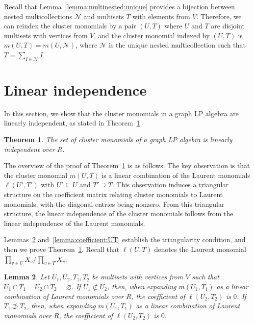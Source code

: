 \documentclass[11pt]{article}
\newtheorem{theo}{Theorem}[section]
\newtheorem{lemm}[theo]{Lemma}
\theoremstyle{definition}
\numberwithin{equation}{section}
\newcommand{\vertices}{V}
\newcommand{\coefficientring}{R}
\newcommand{\laurentmonomial}[2]{\ell(#1, #2)}
\newcommand{\monomial}[2]{m(#1, #2)}
\begin{document}
Recall that Lemma~\ref{lemma:multinested:unique} provides a bijection between nested multicollections \(\mathcal{N}\) and multisets \(T\) with elements from \(\vertices\).
Therefore, we can reindex the cluster monomials by a pair \((U, T)\) where \(U\) and \(T\) are disjoint multisets with vertices from \(\vertices\),
and the cluster monomial indexed by \((U, T)\) is 
\( \monomial{U}{T} = \monomial{U}{\mathcal{N}} \),
where \(\mathcal{N}\) is the unique nested multicollection such that \(T = \sum_{I \in \mathcal{N}} I\).

\section{Linear independence} \label{section:linearindependence}

In this section, we show that the cluster monomials in a graph LP algebra are linearly independent, as stated in Theorem~\ref{theorem:linearindependence}.

\begin{theo} \label{theorem:linearindependence}
    The set of cluster monomials of a graph LP algebra is linearly independent over \(\coefficientring\).
\end{theo}

The overview of the proof of Theorem~\ref{theorem:linearindependence} is as follows.
The key observation is that the cluster monomial \(\monomial{U}{T}\) is a linear combination of the Laurent monomials \( \laurentmonomial{U'}{T'} \) with \(U' \subseteq U\) and \(T' \supseteq T\).
This observation induces a triangular structure on the coefficient matrix relating cluster monomials to Laurent monomials, with the diagonal entries being nonzero.
From this triangular structure, the linear independence of the cluster monomials follows from the linear independence of the Laurent monomials.

Lemmas~\ref{lemma:coefficient:U1T1U2T2} and~\ref{lemma:coefficient:UT} establish the triangularity condition,
and then we prove Theorem~\ref{theorem:linearindependence}.
Recall that \(\laurentmonomial{U}{T}\) denotes the Laurent monomial \({\prod_{v \in U} X_v} \big/ {\prod_{v \in T}X_v}\). 

\begin{lemm} \label{lemma:coefficient:U1T1U2T2}
    Let \(U_1, U_2, T_1, T_2\) be multisets with vertices from \(\vertices\)
    such that \(U_1 \cap T_1 = U_2 \cap T_2 = \varnothing\).
    If \(U_1 \not\subset U_2\), then, when expanding \(\monomial{U_1}{T_1}\) as a linear combination of Laurent monomials over \(\coefficientring\), the coefficient of \(\laurentmonomial{U_2}{T_2}\) is \(0\).
    If \(T_1 \not\supset T_2\), then, when expanding \(\monomial{U_1}{T_1}\) as a linear combination of Laurent monomials over \(\coefficientring\), the coefficient of \(\laurentmonomial{U_2}{T_2}\) is \(0\).
\end{lemm}
\end{document}
